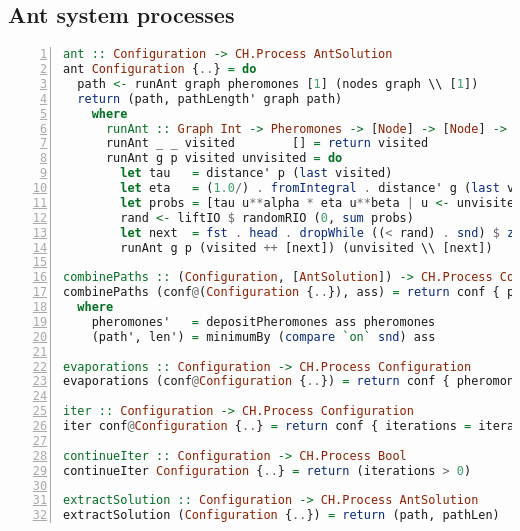 \begin{landscape}
\section{Ant system processes}
\label{app:ant_system_processes}

\begin{lstlisting}[language=Haskell,frame=tb,numbers=left,caption=Implementation of basic processes for the ant system., basicstyle=\footnotesize\ttfamily]
ant :: Configuration -> CH.Process AntSolution
ant Configuration {..} = do
  path <- runAnt graph pheromones [1] (nodes graph \\ [1])
  return (path, pathLength' graph path)
    where
      runAnt :: Graph Int -> Pheromones -> [Node] -> [Node] -> CH.Process Path
      runAnt _ _ visited        [] = return visited
      runAnt g p visited unvisited = do
        let tau   = distance' p (last visited)
        let eta   = (1.0/) . fromIntegral . distance' g (last visited)
        let probs = [tau u**alpha * eta u**beta | u <- unvisited]
        rand <- liftIO $ randomRIO (0, sum probs)
        let next  = fst . head . dropWhile ((< rand) . snd) $ zip unvisited (scanl1 (+) probs)
        runAnt g p (visited ++ [next]) (unvisited \\ [next])

combinePaths :: (Configuration, [AntSolution]) -> CH.Process Configuration
combinePaths (conf@(Configuration {..}), ass) = return conf { pheromones = pheromones', path = path', pathLen = len' }
  where
    pheromones'   = depositPheromones ass pheromones
    (path', len') = minimumBy (compare `on` snd) ass

evaporations :: Configuration -> CH.Process Configuration
evaporations (conf@Configuration {..}) = return conf { pheromones = evaporation rho pheromones }

iter :: Configuration -> CH.Process Configuration
iter conf@Configuration {..} = return conf { iterations = iterations - 1 }

continueIter :: Configuration -> CH.Process Bool
continueIter Configuration {..} = return (iterations > 0)

extractSolution :: Configuration -> CH.Process AntSolution
extractSolution (Configuration {..}) = return (path, pathLen)
\end{lstlisting}

\end{landscape}